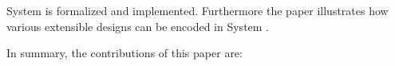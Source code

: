 System \name is
formalized and implemented. Furthermore the paper illustrates how
various extensible designs can be encoded in System \name.

\begin{comment}
We present a polymorphic calculus containing intersection types and records, and show
how this language can be used to solve various common tasks in functional
programming in a nicer way.Intersection types provides a power mechanism for functional programming, in
particular for extensibility and allowing new forms of composition.

Prototype-based programming is one of the two major styles of object-oriented
programming, the other being class-based programming which is featured in
languages such as Java and C\#. It has gained increasing popularity recently
with the prominence of JavaScript in web applications. Prototype-based
programming supports highly dynamic behaviors at run time that are not possible
with traditional class-based programming. However, despite its flexibility,
prototype-based programming is often criticized over concerns of correctness and
safety. Furthermore, almost all prototype-based systems rely on the fact that
the language is dynamically typed and interpreted.
\end{comment}

In summary, the contributions of this paper are:

